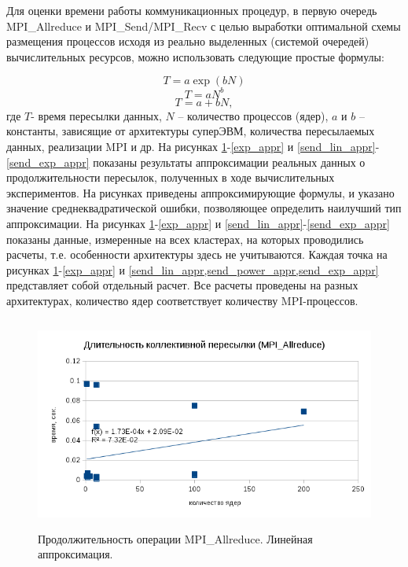         Для оценки времени работы коммуникационных процедур, в первую очередь MPI\_Allreduce и MPI\_Send/MPI\_Recv с целью выработки оптимальной схемы размещения процессов исходя из реально выделенных (системой очередей) вычислительных ресурсов, можно использовать следующие простые формулы:
        
$$
T = a \exp (b N)
$$
$$
T = a N^b
$$
$$
T = a +bN,
$$
        где $T$- время пересылки данных, $N$ – количество процессов (ядер), $a$ и $b$ – константы, зависящие от архитектуры суперЭВМ, количества пересылаемых данных, реализации MPI и др. На рисунках \ref{lin_appr}-\ref{exp_appr} и \ref{send_lin_appr}-\ref{send_exp_appr} показаны результаты аппроксимации реальных данных о продолжительности пересылок, полученных в ходе вычислительных экспериментов. На рисунках приведены аппроксимирующие формулы, и указано значение среднеквадратической ошибки, позволяющее определить наилучший тип аппроксимации. На рисунках \ref{lin_appr}-\ref{exp_appr} и \ref{send_lin_appr}-\ref{send_exp_appr} показаны данные, измеренные на всех кластерах, на которых проводились расчеты, т.е. особенности архитектуры здесь не учитываются.
        Каждая точка на рисунках \ref{lin_appr}-\ref{exp_appr} и \ref{send_lin_appr,send_power_appr,send_exp_appr} представляет собой отдельный расчет. Все расчеты проведены на разных архитектурах, количество ядер соответствует количеству MPI-процессов.
        
        \begin{figure}[htb]
        	\begin{center}
        		\includegraphics[height=7cm,keepaspectratio]{images/RomanenkoAASnytnikovAVChernykhIGadaptationtosupercomputerfinalEXTENDEDREFERENCES-img2.png}
        	\end{center}
        	\caption{Продолжительность операции MPI\_Allreduce. Линейная аппроксимация.}
        	\label{lin_appr}
        \end{figure}
        
